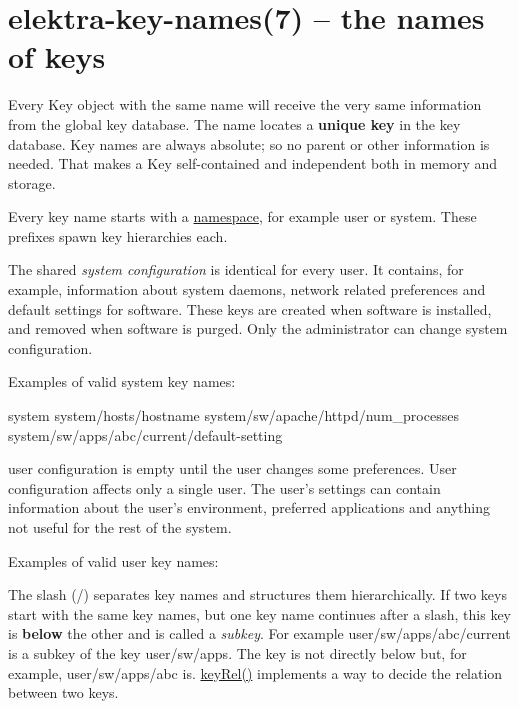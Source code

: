 \section*{elektra-\/key-\/names(7) -- the names of keys }

Every {\ttfamily Key} object with the same name will receive the very same information from the global key database. The name locates a {\bfseries unique key} in the key database. Key names are always absolute; so no parent or other information is needed. That makes a {\ttfamily Key} self-\/contained and independent both in memory and storage.

Every key name starts with a \hyperlink{md_doc_help_elektra-namespaces_doc_help_elektra-namespaces_md}{namespace}, for example {\ttfamily user} or {\ttfamily system}. These prefixes spawn key hierarchies each.

The shared {\itshape system configuration} is identical for every user. It contains, for example, information about system daemons, network related preferences and default settings for software. These keys are created when software is installed, and removed when software is purged. Only the administrator can change system configuration.

Examples of valid system key names\+: \begin{DoxyVerb}    system
    system/hosts/hostname
    system/sw/apache/httpd/num_processes
    system/sw/apps/abc/current/default-setting
\end{DoxyVerb}


user configuration is empty until the user changes some preferences. User configuration affects only a single user. The user's settings can contain information about the user's environment, preferred applications and anything not useful for the rest of the system.

Examples of valid user key names\+: 


The slash ({\ttfamily /}) separates key names and structures them hierarchically. If two keys start with the same key names, but one key name continues after a slash, this key is {\bfseries below} the other and is called a {\itshape subkey}. For example {\ttfamily user/sw/apps/abc/current} is a subkey of the key {\ttfamily user/sw/apps}. The key is not directly below but, for example, {\ttfamily user/sw/apps/abc} is. {\ttfamily \hyperlink{group__keytest_ga6bb0f95ac34ce9c42d61bb35a76139d0}{key\+Rel()}} implements a way to decide the relation between two keys. 